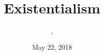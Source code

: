 \documentclass[xcolor=dvipsnames]{beamer}
\title{Existentialism}
\subtitle{{\CourseNumber}, {\CourseInst}}
\author{\CourseName}
\date{May 22, 2018}
\begin{document}
\begin{frame}
  \titlepage
\end{frame}


\end{document}
